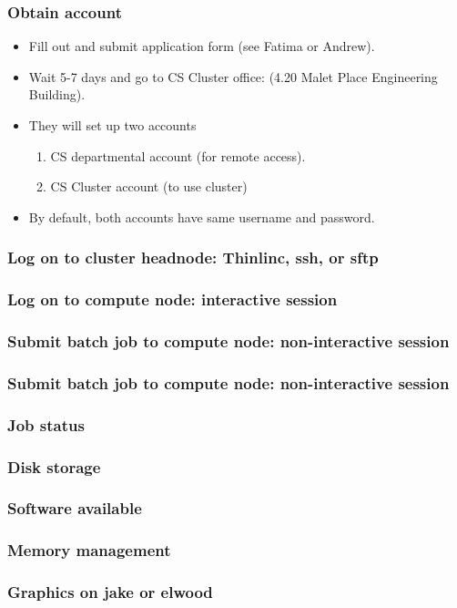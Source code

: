 \documentclass{beamer}
\begin{document}
\begin{frame}
\frametitle{Obtain account}
\begin{itemize}
\item Fill out and submit application form (see Fatima or Andrew).
\item Wait 5-7 days and go to CS Cluster office: (4.20 Malet Place Engineering Building).
\item They will set up two accounts
\begin{enumerate}
\item CS departmental account (for remote access).
\item CS Cluster account (to use cluster)
\end{enumerate}
\item By default, both accounts have same username and password.
\end{itemize}
\end{frame}

\begin{frame}
\frametitle{Log on to cluster headnode: Thinlinc, ssh, or sftp}
\end{frame}

\begin{frame}
\frametitle{Log on to compute node: interactive session}
\end{frame}

\begin{frame}
\frametitle{Submit batch job to compute node: non-interactive session}
\end{frame}

\begin{frame}
\frametitle{Submit batch job to compute node: non-interactive session}
\end{frame}

\begin{frame}
\frametitle{Job status}
\end{frame}

\begin{frame}
\frametitle{Disk storage}
\end{frame}

\begin{frame}
\frametitle{Software available}
\end{frame}

\begin{frame}
\frametitle{Memory management}
\end{frame}

\begin{frame}
\frametitle{Graphics on jake or elwood}

\end{frame}
\end{document}
